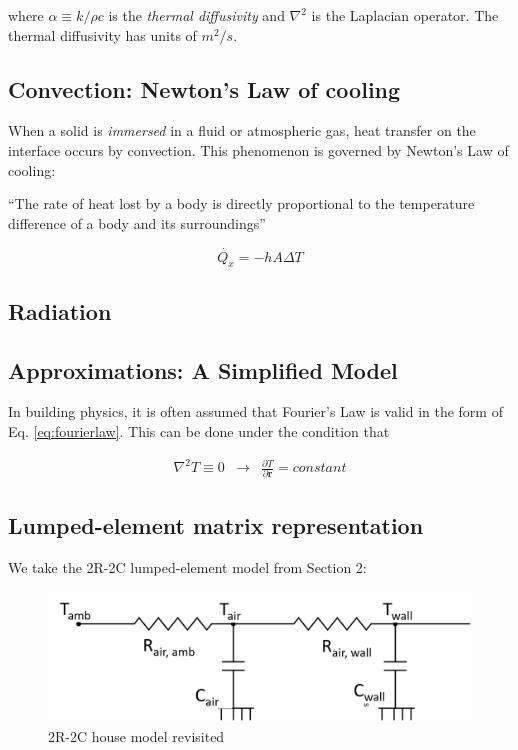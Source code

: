 where $\alpha \equiv k /\rho c$ is the \emph{thermal diffusivity} and $\nabla^2$ is the Laplacian operator. The thermal diffusivity has units of $m^2/s$.


\subsection{Convection: Newton's Law of cooling}

When a solid is \emph{immersed} in a fluid or atmospheric gas, heat transfer on the interface occurs by convection. This phenomenon is governed by Newton's Law of cooling:

“The rate of heat lost by a body is directly proportional to the temperature difference of a body and its surroundings”

\begin{equation}
	\label{eq:newtonlaw}
	\dot{Q_x} = - hA \Delta T
\end{equation}

\subsection{Radiation}

\subsection{Approximations: A Simplified Model}

In building physics, it is often assumed that Fourier's Law is valid in the form of Eq. \eqref{eq:fourierlaw}. This can be done under the condition that 

\begin{equation}
	\begin{aligned}
	    \nabla^2 T \equiv 0 & \rightarrow & \frac{\partial T}{\partial \mathbf{r}} = constant
    \end{aligned}
\end{equation}

\subsection{Lumped-element matrix representation}

We take the 2R-2C lumped-element model from Section 2:

\begin{figure}[H]
	\centering
	\includegraphics[width=0.7\columnwidth]{Pictures/2R2Cmodel_rev.png}
	\caption[Short title]{2R-2C house model revisited}
	\label{fig:elec2R2Cbis}
\end{figure}

